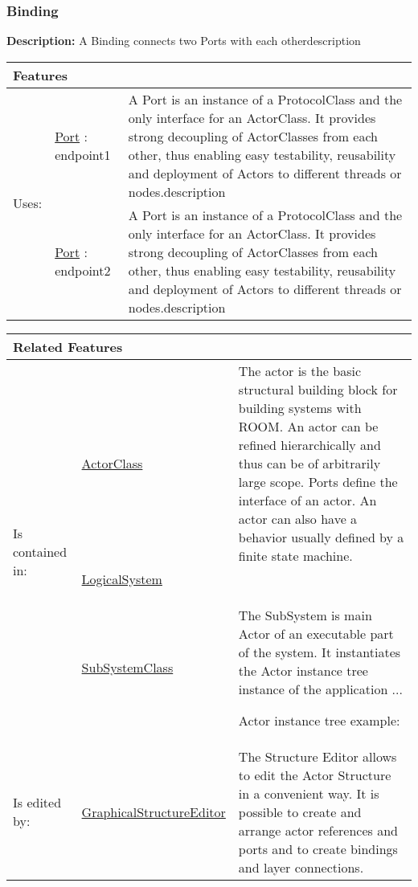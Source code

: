 		\subsubsection{\huge Binding}
			\hypertarget{ref:Binding}{}
			
			\textbf{Description:} A Binding connects two Ports with each otherdescription
			
			
			\begingroup
			\renewcommand{\arraystretch}{1.8} %
			\begin{longtable}{p{2.5cm}|p{4cm} p{}}
				\multicolumn{2}{l}{\textbf{\large Features}} & \\
				\hline
			\multirow{2}{*}{Uses:} & \tabitem \hyperlink{ref:Port}{Port} : endpoint1 & A Port is an instance of a ProtocolClass and the only interface for an ActorClass. It provides strong decoupling of ActorClasses from each other, thus enabling easy testability, reusability and deployment of Actors to different threads or nodes.description \\
			& \tabitem \hyperlink{ref:Port}{Port} : endpoint2 & A Port is an instance of a ProtocolClass and the only interface for an ActorClass. It provides strong decoupling of ActorClasses from each other, thus enabling easy testability, reusability and deployment of Actors to different threads or nodes.description  \\
			\hline
			\end{longtable}
			\endgroup
			
			\begingroup
			\renewcommand{\arraystretch}{1.8} %
			\begin{longtable}{p{2.5cm}|p{4cm} p{}}
				\multicolumn{2}{l}{\textbf{\large Related Features}} & \\
				\hline
			\multirow{3}{*}{Is contained in:} & \tabitem \hyperlink{ref:ActorClass}{ActorClass}  & The actor is the basic structural building block for building systems with ROOM. An actor can be refined hierarchically and thus can be of arbitrarily large scope. Ports define the interface of an actor. An actor can also have a behavior usually defined by a finite state machine. \\
			& \tabitem \hyperlink{ref:LogicalSystem}{LogicalSystem}  &  \\
			& \tabitem \hyperlink{ref:SubSystemClass}{SubSystemClass}  & The SubSystem is main Actor of an executable part of the system. It instantiates the Actor instance tree instance of the application ...
				
				Actor instance tree example:
			 \\
			\hline
			Is edited by: & \tabitem \hyperlink{ref:GraphicalStructureEditor}{GraphicalStructureEditor}  & The Structure Editor allows to edit the Actor Structure in a convenient way. It is possible to create and arrange actor references and ports and to create bindings and layer connections.\\
			\hline
			\end{longtable}
			\endgroup
			
